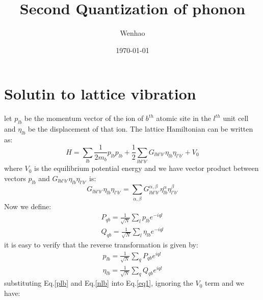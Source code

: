\documentclass{article}
\begin{document}
\title{Second Quantization of phonon}
\author{Wenhao}
\date{\today}
\maketitle

\section{Solutin to lattice vibration}
let $p_{lb}$ be the momentum vector of the ion of $b^{th}$ atomic site in the $l^{th}$ unit cell 
and $\eta_{lb}$ be the displacement of that ion. The lattice Hamiltonian can be written as:
\begin{equation}
    H = \sum_{lb} \frac{1}{2m_b} p_{lb} p_{lb} + \frac{1}{2} \sum_{lbl'b'} G_{lbl'b'} \eta_{lb} \eta_{l'b'} + V_0 \label{eq1}
\end{equation}
where $V_0$ is the equilibrium potential energy and 
we have vector product between vectors $p_{lb}$ and $G_{lbl'b'} \eta_{lb} \eta_{l'b'}$ is:
\begin{equation}
    G_{lbl'b'} \eta_{lb} \eta_{l'b'} = \sum_{\alpha,\beta} G_{lbl'b'}^{\alpha,\beta} \eta_{lb}^{\alpha} \eta_{l'b'} ^{\beta}
\end{equation}
Now we define:
\begin{gather}
    P_{qb} = \frac{1}{\sqrt{N}} \sum_{l} p_{lb} e^{-iql} \\
    Q_{qb} = \frac{1}{\sqrt{N}} \sum_{l} \eta_{lb} e^{-iql}
\end{gather}
it is easy to verify that the reverse transformation is given by:
\begin{gather}
    p_{lb} = \frac{1}{\sqrt{N}} \sum_{q} P_{qb} e^{iql} \label{plb} \\
    \eta_{lb} = \frac{1}{\sqrt{N}} \sum_{q} Q_{qb} e^{iql} \label{nlb}
\end{gather}
substituting Eq.\ref{plb} and Eq.\ref{nlb} into Eq.\ref{eq1}, ignoring the $V_0$ term and we have:
\end{document}
